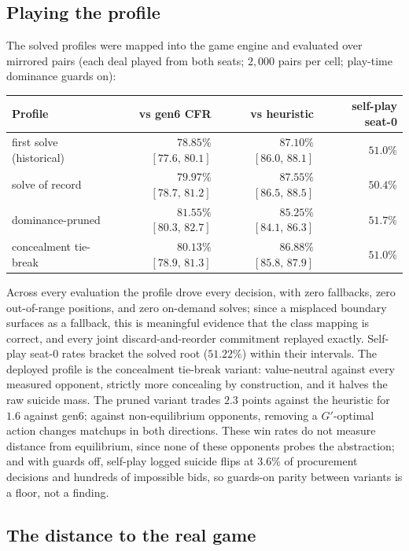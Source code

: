 \documentclass[11pt]{article}
\theoremstyle{plain}
\theoremstyle{definition}
\theoremstyle{remark}
\newcommand{\gp}{\ensuremath{G'}}
\begin{document}
\subsection{Playing the profile}\label{sec:playing}

The solved profiles were mapped into the game engine and evaluated over mirrored
pairs (each deal played from both seats; $2{,}000$ pairs per cell; play-time
dominance guards on):

\begin{center}\small
\begin{tabular}{@{}lrrr@{}}
\toprule
Profile & vs gen6 CFR & vs heuristic & self-play seat-0\\
\midrule
first solve (historical) & $78.85\%$ $[77.6,\,80.1]$ & $87.10\%$ $[86.0,\,88.1]$ & $51.0\%$\\
solve of record & $79.97\%$ $[78.7,\,81.2]$ & $87.55\%$ $[86.5,\,88.5]$ & $50.4\%$\\
dominance-pruned & $\mathbf{81.55\%}$ $[80.3,\,82.7]$ & $85.25\%$ $[84.1,\,86.3]$ & $51.7\%$\\
concealment tie-break & $80.13\%$ $[78.9,\,81.3]$ & $86.88\%$ $[85.8,\,87.9]$ & $51.0\%$\\
\bottomrule
\end{tabular}
\end{center}

Across every evaluation the profile drove every decision, with zero fallbacks,
zero out-of-range positions, and zero on-demand solves; since a misplaced
boundary surfaces as a fallback, this is meaningful evidence that the class
mapping is correct, and every joint discard-and-reorder commitment replayed
exactly. Self-play seat-0 rates bracket the solved root ($51.22\%$) within their
intervals. The deployed profile is the concealment tie-break variant:
value-neutral against every measured opponent, strictly more concealing by
construction, and it halves the raw suicide mass. The pruned variant trades
$2.3$ points against the heuristic for $1.6$ against gen6; against
non-equilibrium opponents, removing a $\gp$-optimal action changes matchups in
both directions. These win rates do not measure distance from equilibrium, since
none of these opponents probes the abstraction; and with guards off, self-play
logged suicide flips at $3.6\%$ of procurement decisions and hundreds of
impossible bids, so guards-on parity between variants is a floor, not a finding.

\subsection{The distance to the real game}\label{sec:distance}
\end{document}
